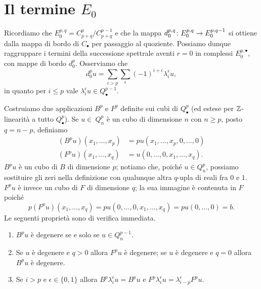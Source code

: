 \section{Il termine \texorpdfstring{\(E_0\)}{E0}}
Ricordiamo che \(E^{p,q}_0=C^p_{p+q}/C^{p-1}_{p+q}\) e che la mappa \(\map{d^{p,q}_0}{E^{p,q}_0}{E^{p,q-1}_0}\) si ottiene dalla mappa di bordo di \(C_\bullet\) per passaggio al quoziente. Possiamo dunque raggruppare i termini della successione spettrale aventi \(r=0\) in complessi \(E^{p,\bullet}_0\), con mappe di bordo \(d^p_0\). Osserviamo che
\[
d^p_0u=\sum_{i>p}\sum_\epsilon(-1)^{i+\epsilon}\lambda^\epsilon_iu,
\]
in quanto per \(i\le p\) vale \(\lambda^\epsilon_iu\in Q^{p-1}_\bullet\).


Costruiamo due applicazioni \(B^p\) e \(F^p\) definite sui cubi di \(Q^p_\bullet\) (ed estese per \(\mathbb{Z}\)-linearità a tutto \(Q^p_\bullet\)). Se \(u\in\ Q^p_n\) è un cubo di dimensione \(n\) con \(n\ge p\), posto \(q=n-p\), definiamo
\begin{align*}
(B^pu)(x_1,\ldots,x_p)&=pu(x_1,\ldots,x_p,0,\ldots,0)\\
(F^pu)(x_1,\ldots,x_q)&=u(0,\ldots,0,x_1,\ldots,x_q).
\end{align*}
\(B^pu\) è un cubo di \(B\) di dimensione \(p\); notiamo che, poiché \(u\in Q^p_n\), possiamo sostituire gli zeri nella definizione con qualunque altra \(q\)-upla di reali fra \(0\) e \(1\). \(F^pu\) è invece un cubo di \(F\) di dimensione \(q\); la sua immagine è contenuta in \(F\) poiché
\[
p(F^pu)(x_1,\ldots,x_q)=pu(0,\ldots,0,x_1,\ldots,x_q)=pu(0,\ldots,0)=b.
\]
Le seguenti proprietà sono di verifica immediata.
\begin{enumerate}
\item\label{spectral-sequence-of-fibration:pr1} \(B^pu\) è degenere se e solo se \(u\in Q^{p-1}_n\).
\item\label{spectral-sequence-of-fibration:pr2} Se \(u\) è degenere e \(q>0\) allora \(F^pu\) è degenere; se \(u\) è degenere e \(q=0\) allora \(B^pu\) è degenere.
\item\label{spectral-sequence-of-fibration:pr3} Se \(i>p\) e \(\epsilon\in\{0,1\}\) allora \(B^p\lambda^\epsilon_iu=B^pu\) e \(F^p\lambda^\epsilon_iu=\lambda^\epsilon_{i-p}F^pu\).
\end{enumerate}

